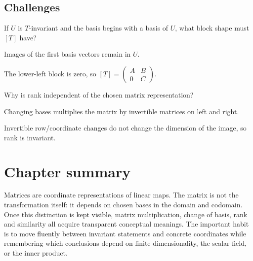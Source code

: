 \subsection*{Challenges}

\begin{exercise}\label{exr:i07-expand-15}
If \(U\) is \(T\)-invariant and the basis begins with a basis of \(U\), what block shape must \([T]\) have?
\end{exercise}
\begin{hint}
Images of the first basis vectors remain in \(U\).
\end{hint}
\begin{solution}
The lower-left block is zero, so \([T]=\begin{pmatrix}A&B\\0&C\end{pmatrix}\).
\end{solution}

\begin{exercise}\label{exr:i07-expand-16}
Why is rank independent of the chosen matrix representation?
\end{exercise}
\begin{hint}
Changing bases multiplies the matrix by invertible matrices on left and right.
\end{hint}
\begin{solution}
Invertible row/coordinate changes do not change the dimension of the image, so rank is invariant.
\end{solution}
\section*{Chapter summary}
Matrices are coordinate representations of linear maps. The matrix is not the transformation itself: it depends on chosen bases in the domain and codomain. Once this distinction is kept visible, matrix multiplication, change of basis, rank and similarity all acquire transparent conceptual meanings.
The important habit is to move fluently between invariant statements and concrete coordinates while remembering which conclusions depend on finite dimensionality, the scalar field, or the inner product.
